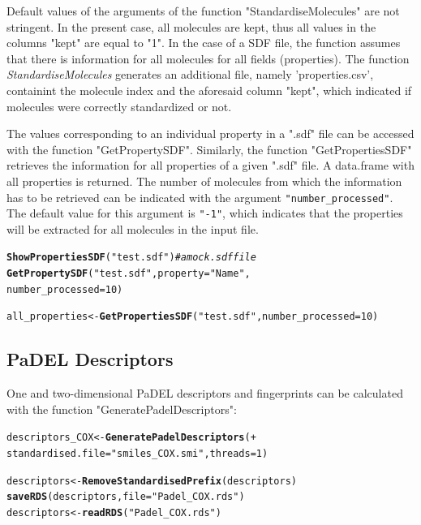 \documentclass[twoside,a4wide,12pt]{article}\usepackage[]{graphicx}\usepackage[]{color}
\makeatletter
\newcommand{\hlnum}[1]{\textcolor[rgb]{0.686,0.059,0.569}{#1}}%
\newcommand{\hlstr}[1]{\textcolor[rgb]{0.192,0.494,0.8}{#1}}%
\newcommand{\hlcom}[1]{\textcolor[rgb]{0.678,0.584,0.686}{\textit{#1}}}%
\newcommand{\hlstd}[1]{\textcolor[rgb]{0.345,0.345,0.345}{#1}}%
\newcommand{\hlkwb}[1]{\textcolor[rgb]{0.69,0.353,0.396}{#1}}%
\newcommand{\hlkwc}[1]{\textcolor[rgb]{0.333,0.667,0.333}{#1}}%
\newcommand{\hlkwd}[1]{\textcolor[rgb]{0.737,0.353,0.396}{\textbf{#1}}}%
\newenvironment{kframe}{%
 \def\at@end@of@kframe{}%
 \ifinner\ifhmode%
  \def\at@end@of@kframe{\end{minipage}}%
  \begin{minipage}{\columnwidth}%
 \fi\fi%
 \def\FrameCommand##1{\hskip\@totalleftmargin \hskip-\fboxsep
 \colorbox{shadecolor}{##1}\hskip-\fboxsep
     \hskip-\linewidth \hskip-\@totalleftmargin \hskip\columnwidth}%
 \MakeFramed {\advance\hsize-\width
   \@totalleftmargin\z@ \linewidth\hsize
   \@setminipage}}%
 {\par\unskip\endMakeFramed%
 \at@end@of@kframe}
\newenvironment{knitrout}{}{} %
\makeatother
\begin{document}
Default values of the arguments of the function "StandardiseMolecules" are not stringent.
In the present case, all molecules are kept, thus all values in the columns "kept"
are equal to "1". 
In the case of a SDF file, the function assumes that there is information 
for all molecules for all fields (properties).
The function {\it StandardiseMolecules} generates an additional file, 
namely 'properties.csv', containint the molecule index and the aforesaid column "kept",
which indicated if molecules were correctly standardized or not.

The values corresponding to an individual property in a ".sdf" file can be accessed with the function "GetPropertySDF".
Similarly, the function "GetPropertiesSDF" retrieves the information for all properties of a given ".sdf" file.
A data.frame with all properties is returned.
The number of molecules from which the information has to be retrieved can be indicated with the argument \verb|"number_processed"|.
The default value for this argument is \verb|"-1"|, which indicates that the properties will be extracted for all molecules in the input file.
\begin{knitrout}
\color{fgcolor}\begin{kframe}
\begin{alltt}
\hlkwd{ShowPropertiesSDF}\hlstd{(}\hlstr{"test.sdf"}\hlstd{)} \hlcom{# a mock .sdf file}
\hlkwd{GetPropertySDF}\hlstd{(}\hlstr{"test.sdf"}\hlstd{,}\hlkwc{property}\hlstd{=}\hlstr{"Name"}\hlstd{,}
               \hlkwc{number_processed}\hlstd{=}\hlnum{10}\hlstd{)}

\hlstd{all_properties} \hlkwb{<-} \hlkwd{GetPropertiesSDF}\hlstd{(}\hlstr{"test.sdf"}\hlstd{,}\hlkwc{number_processed}\hlstd{=}\hlnum{10}\hlstd{)}
\end{alltt}
\end{kframe}
\end{knitrout}

\subsection{PaDEL Descriptors}
One and two-dimensional PaDEL\cite{padel} descriptors and fingerprints can be calculated with the function "GeneratePadelDescriptors":
\begin{knitrout}
\color{fgcolor}\begin{kframe}
\begin{alltt}
descriptors_COX <- \hlkwd{GeneratePadelDescriptors}( +
  standardised.file=\hlstr{"smiles_COX.smi"},threads = 1)

descriptors <- \hlkwd{RemoveStandardisedPrefix}(descriptors)
\hlkwd{saveRDS}(descriptors, file=\hlstr{"Padel_COX.rds"})
descriptors <- \hlkwd{readRDS}(\hlstr{"Padel_COX.rds"})
\end{alltt}
\end{kframe}
\end{knitrout}
\end{document}
